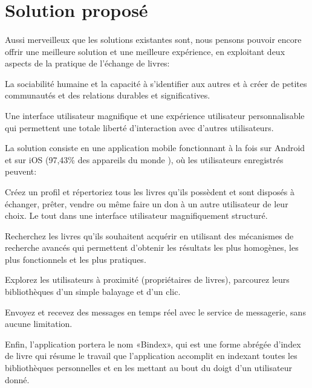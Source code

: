 \newpage
\section{Solution proposé}
\paragraph*{}
Aussi merveilleux que les solutions existantes sont, nous pensons pouvoir encore offrir une meilleure solution et une meilleure expérience, en exploitant deux aspects de la pratique de l'échange de livres:

\begin{list}{•}{}
	\item La sociabilité humaine et la capacité à s'identifier aux autres et à créer de petites communautés et des relations durables et significatives.
	\item Une interface utilisateur magnifique et une expérience utilisateur personnalisable qui permettent une totale liberté d'interaction avec d'autres utilisateurs.
\end{list}

La solution consiste en une application mobile fonctionnant à la fois sur Android et sur iOS (97,43\% des appareils du monde \cite{noauthor_mobile_nodate}), où les utilisateurs enregistrés peuvent:

\begin{list}{•}{}
	\item Créez un profil et répertoriez tous les livres qu’ils possèdent et sont disposés à échanger, prêter, vendre ou même faire un don à un autre utilisateur de leur choix. Le tout dans une interface utilisateur magnifiquement structuré.
	\item Recherchez les livres qu'ils souhaitent acquérir en utilisant des mécanismes de recherche avancés qui permettent d'obtenir les résultats les plus homogènes, les plus fonctionnels et les plus pratiques.
	\item Explorez les utilisateurs à proximité (propriétaires de livres), parcourez leurs bibliothèques d'un simple balayage et d'un clic.
	\item Envoyez et recevez des messages en temps réel avec le service de messagerie, sans aucune limitation.
\end{list}

Enfin, l’application portera le nom «Bindex», qui est une forme abrégée d’index de livre qui résume le travail que l’application accomplit en indexant toutes les bibliothèques personnelles et en les mettant au bout du doigt d’un utilisateur donné.

